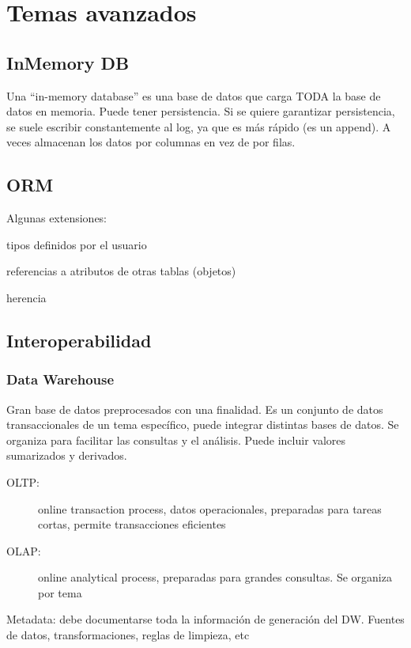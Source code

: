 \chapter{Temas avanzados}

\section{InMemory DB}

Una “in-memory database” es una base de datos que carga TODA la base de datos en memoria.
Puede tener persistencia.
Si se quiere garantizar persistencia, se suele escribir constantemente al log, ya que es más rápido (es un append).
A veces almacenan los datos por columnas en vez de por filas.

\section{ORM}

Algunas extensiones:

tipos definidos por el usuario

referencias a atributos de otras tablas (objetos)

herencia

\section{Interoperabilidad}

\subsection{Data Warehouse}

Gran base de datos preprocesados con una finalidad. Es un conjunto de datos transaccionales de un tema específico, puede integrar distintas bases de datos. Se organiza para facilitar las consultas y el análisis. Puede incluir valores sumarizados y derivados.

\begin{description}
	\item[OLTP:] online transaction process, datos operacionales, preparadas para tareas cortas, permite transacciones eficientes
	\item[OLAP:] online analytical process, preparadas para grandes consultas. Se organiza por tema
\end{description}

Metadata: debe documentarse toda la información de generación del DW. Fuentes de datos, transformaciones, reglas de limpieza, etc

